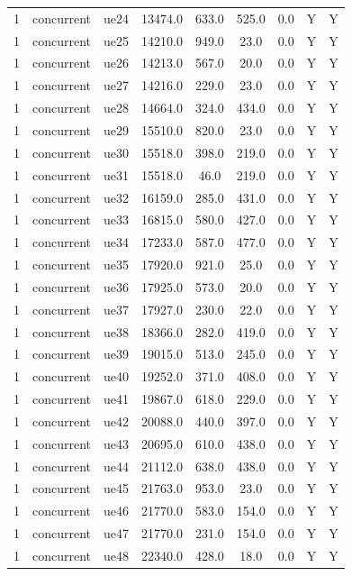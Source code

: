 \begin{table}[ht]
\begin{tabular}{|c|c|c|c|c|c|c|c|c|}
1 & concurrent & ue24 & 13474.0 & 633.0 & 525.0 & 0.0 & Y & Y \\
1 & concurrent & ue25 & 14210.0 & 949.0 & 23.0 & 0.0 & Y & Y \\
1 & concurrent & ue26 & 14213.0 & 567.0 & 20.0 & 0.0 & Y & Y \\
1 & concurrent & ue27 & 14216.0 & 229.0 & 23.0 & 0.0 & Y & Y \\
1 & concurrent & ue28 & 14664.0 & 324.0 & 434.0 & 0.0 & Y & Y \\
1 & concurrent & ue29 & 15510.0 & 820.0 & 23.0 & 0.0 & Y & Y \\
1 & concurrent & ue30 & 15518.0 & 398.0 & 219.0 & 0.0 & Y & Y \\
1 & concurrent & ue31 & 15518.0 & 46.0 & 219.0 & 0.0 & Y & Y \\
1 & concurrent & ue32 & 16159.0 & 285.0 & 431.0 & 0.0 & Y & Y \\
1 & concurrent & ue33 & 16815.0 & 580.0 & 427.0 & 0.0 & Y & Y \\
1 & concurrent & ue34 & 17233.0 & 587.0 & 477.0 & 0.0 & Y & Y \\
1 & concurrent & ue35 & 17920.0 & 921.0 & 25.0 & 0.0 & Y & Y \\
1 & concurrent & ue36 & 17925.0 & 573.0 & 20.0 & 0.0 & Y & Y \\
1 & concurrent & ue37 & 17927.0 & 230.0 & 22.0 & 0.0 & Y & Y \\
1 & concurrent & ue38 & 18366.0 & 282.0 & 419.0 & 0.0 & Y & Y \\
1 & concurrent & ue39 & 19015.0 & 513.0 & 245.0 & 0.0 & Y & Y \\
1 & concurrent & ue40 & 19252.0 & 371.0 & 408.0 & 0.0 & Y & Y \\
1 & concurrent & ue41 & 19867.0 & 618.0 & 229.0 & 0.0 & Y & Y \\
1 & concurrent & ue42 & 20088.0 & 440.0 & 397.0 & 0.0 & Y & Y \\
1 & concurrent & ue43 & 20695.0 & 610.0 & 438.0 & 0.0 & Y & Y \\
1 & concurrent & ue44 & 21112.0 & 638.0 & 438.0 & 0.0 & Y & Y \\
1 & concurrent & ue45 & 21763.0 & 953.0 & 23.0 & 0.0 & Y & Y \\
1 & concurrent & ue46 & 21770.0 & 583.0 & 154.0 & 0.0 & Y & Y \\
1 & concurrent & ue47 & 21770.0 & 231.0 & 154.0 & 0.0 & Y & Y \\
1 & concurrent & ue48 & 22340.0 & 428.0 & 18.0 & 0.0 & Y & Y \\

\end{tabular}
\end{table}
